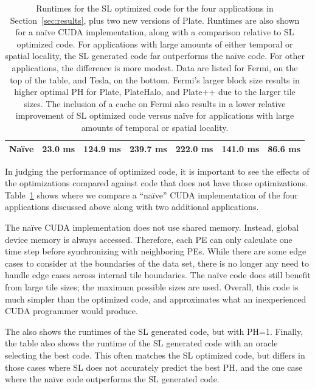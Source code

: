 \documentclass{sig-alternate}
\begin{document}
\begin{table}
\begin{tabular}{|l||c|c|c|c|c|c|}
Na\"{i}ve	& 23.0	ms	& 124.9 ms	& 239.7 ms	& 222.0 ms	& 141.0 ms	& 86.6	ms	\\

\hline

\end{tabular}

\caption{ Runtimes for the SL optimized code for the four applications in
  Section~\ref{sec:results}, plus two new versions of Plate.  Runtimes are
  also shown for a na\"{i}ve CUDA implementation, along with a comparison
  relative to SL optimized code.  For applications with large amounts of
  either temporal or spatial locality, the SL generated code far outperforms
  the na\"{i}ve code.  For other applications, the difference is more modest.
  Data are listed for Fermi, on the top of the table, and Tesla, on the
  bottom.  Fermi's larger block size results in higher optimal PH for Plate,
  PlateHalo, and Plate++ due to the larger tile sizes.  The inclusion of a
  cache on Fermi also results in a lower relative improvement of SL optimized
  code versus na\"{i}ve for applications with large amounts of temporal or
  spatial locality.  }
\label{fig:table}
\end{table}

In judging the performance of optimized code, it is important to see the
effects of the optimizations compared against code that does not have those
optimizations.  Table~\ref{fig:table} shows where we compare a ``na\"{i}ve''
CUDA implementation of the four applications discussed above along with two
additional applications.

The na\"{i}ve CUDA implementation does not use shared memory.  Instead,
global device memory is always accessed.  Therefore, each PE can only
calculate one time step before synchronizing with neighboring PEs.  While
there are some edge cases to consider at the boundaries of the data set,
there is no longer any need to handle edge cases across internal tile
boundaries.  The na\"{i}ve code does still benefit from large tile sizes; the
maximum possible sizes are used.  Overall, this code is much simpler than the
optimized code, and approximates what an inexperienced CUDA programmer would
produce.

The also shows the runtimes of the SL generated code, but with PH=1.
Finally, the table also shows the runtime of the SL generated code with an
oracle selecting the best code.  This often matches the SL optimized code,
but differs in those cases where SL does not accurately predict the best PH,
and the one case where the na\"{i}ve code outperforms the SL generated code.
\end{document}
